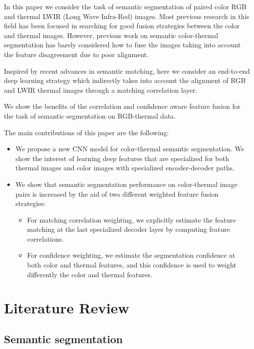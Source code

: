 \documentclass[10pt,twocolumn,letterpaper]{article}
\begin{document}
In this paper we consider the task of semantic segmentation of paired color RGB and thermal LWIR (Long Wave Infra-Red) images. Most previous research in this field has been focused in searching for good fusion strategies between the color and thermal images. However, previous work on semantic color-thermal segmentation has barely considered how to fuse the images taking into account the feature disagreement due to poor alignment.

Inspired by recent advances in semantic matching, here we consider an end-to-end deep learning strategy which indirectly takes into account the alignment of RGB and LWIR thermal images through a matching correlation layer.

We show the benefits of the correlation and confidence aware feature fusion for the task of semantic segmentation on RGB-thermal data. 

The main contributions of this paper are the following:

\begin{itemize}
    \item We propose a new CNN model for color-thermal semantic segmentation. We show the interest of learning deep features that are specialized for both thermal images and color images with specialized encoder-decoder paths. 
    \item We show that semantic segmentation performance on color-thermal image pairs is increased by the aid of two different weighted feature fusion strategies: 
    \begin{itemize}
        \item For matching correlation weighting, we explicitly estimate the feature matching at the last specialized decoder layer by computing feature correlations.
        \item For confidence weighting, we estimate the segmentation confidence at both color and thermal features, and this confidence is used to weight differently the color and thermal features. 
    \end{itemize}   
\end{itemize}


\section{Literature Review}

\subsection{Semantic segmentation}
\end{document}
